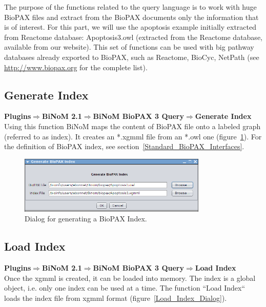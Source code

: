 The purpose of the functions related to the query language is to work with huge
BioPAX files and extract from the BioPAX documents only the information that is
of interest. For this part, we will use the apoptosis example initially
extracted from Reactome database: Apoptosis3.owl (extracted from the Reactome
database, available from our website). This set of functions can be used with
big pathway databases already exported to BioPAX, such as Reactome, BioCyc,
NetPath (see \url{http://www.biopax.org} for the complete list).

\subsection{Generate Index}
\textbf{Plugins$\Rightarrow$BiNoM 2.1$\Rightarrow$BiNoM BioPAX 3 Query$\Rightarrow$Generate Index}\\

Using this function BiNoM maps the content of BioPAX file onto a labeled graph
(referred to as index). It creates an *.xgmml file from an *.owl one
(figure~\ref{Generate_BioPAX_Index}). For the definition of BioPAX index, see
section~\ref{Standard_BioPAX_Interfaces}.

\begin{figure}
\centering
\includegraphics[width=0.8\textwidth]{graphics/ebo_generate_BioPAX_Index}
\caption{Dialog for generating a BioPAX Index.}
\label{Generate_BioPAX_Index}
\end{figure}

\subsection{Load Index}
\textbf{Plugins$\Rightarrow$BiNoM 2.1$\Rightarrow$BiNoM BioPAX 3 Query$\Rightarrow$Load Index}\\

Once the xgmml is created, it can be loaded into memory. The index is a global
object, i.e. only one index can be used at a time. The function ``Load Index`` loads the index
file from xgmml format (figure~\ref{Load_Index_Dialog}).\\\\

